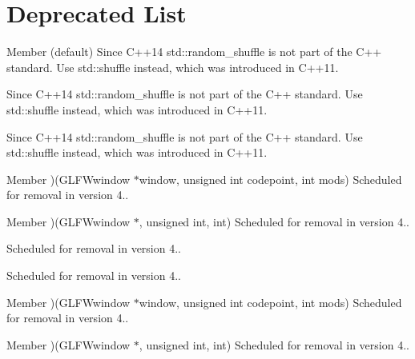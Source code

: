 \chapter{Deprecated List}
\hypertarget{deprecated}{}\label{deprecated}

\begin{DoxyRefList}
\item[Member \doxylink{group__sorting__algorithms_ga544d74b2d5d0dd2197f5fd6f02691de0}{\+\_\+\+GLIBCXX\+\_\+\+VISIBILITY} (default)]\label{deprecated__deprecated000038}%
%
 Since C++14 {\ttfamily std\+::random\+\_\+shuffle} is not part of the C++ standard. Use {\ttfamily std\+::shuffle} instead, which was introduced in C++11. 

\label{deprecated__deprecated000008}%
%
 Since C++14 {\ttfamily std\+::random\+\_\+shuffle} is not part of the C++ standard. Use {\ttfamily std\+::shuffle} instead, which was introduced in C++11. 

\label{deprecated__deprecated000024}%
%
 Since C++14 {\ttfamily std\+::random\+\_\+shuffle} is not part of the C++ standard. Use {\ttfamily std\+::shuffle} instead, which was introduced in C++11.  
\item[Member \doxylink{group__input_gac3cf64f90b6219c05ac7b7822d5a4b8f}{GLFWcharmodsfun} )(GLFWwindow \texorpdfstring{$\ast$}{*}window, unsigned int codepoint, int mods)]\label{deprecated__deprecated000006}%
%
Scheduled for removal in version 4.. 
\item[Member \doxylink{group__input_ga78c3d45fdf9aaef0b8d670bf2a9519e2}{GLFWcharmodsfun} )(GLFWwindow \texorpdfstring{$\ast$}{*}, unsigned int, int)]\label{deprecated__deprecated000034}%
%
Scheduled for removal in version 4..

\label{deprecated__deprecated000030}%
%
Scheduled for removal in version 4..

\label{deprecated__deprecated000014}%
%
Scheduled for removal in version 4.. 
\item[Member \doxylink{group__input_gac3cf64f90b6219c05ac7b7822d5a4b8f}{GLFWcharmodsfun} )(GLFWwindow \texorpdfstring{$\ast$}{*}window, unsigned int codepoint, int mods)]\label{deprecated__deprecated000022}%
%
Scheduled for removal in version 4.. 
\item[Member \doxylink{group__input_ga78c3d45fdf9aaef0b8d670bf2a9519e2}{GLFWcharmodsfun} )(GLFWwindow \texorpdfstring{$\ast$}{*}, unsigned int, int)]\label{deprecated__deprecated000018}%
%
Scheduled for removal in version 4..


\end{DoxyRefList}
